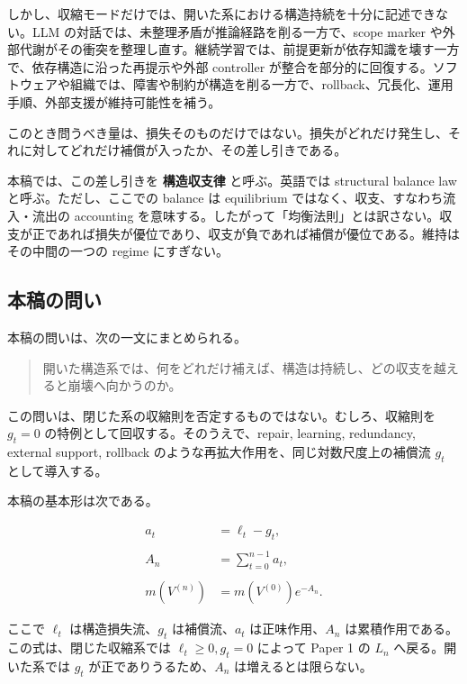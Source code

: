 \documentclass[12pt,a4paper]{article}
\begin{document}
しかし、収縮モードだけでは、開いた系における構造持続を十分に記述できない。LLM の対話では、未整理矛盾が推論経路を削る一方で、scope marker や外部代謝がその衝突を整理し直す。継続学習では、前提更新が依存知識を壊す一方で、依存構造に沿った再提示や外部 controller が整合を部分的に回復する。ソフトウェアや組織では、障害や制約が構造を削る一方で、rollback、冗長化、運用手順、外部支援が維持可能性を補う。

このとき問うべき量は、損失そのものだけではない。損失がどれだけ発生し、それに対してどれだけ補償が入ったか、その差し引きである。

本稿では、この差し引きを \textbf{構造収支律} と呼ぶ。英語では structural balance law と呼ぶ。ただし、ここでの balance は equilibrium ではなく、収支、すなわち流入・流出の accounting を意味する。したがって「均衡法則」とは訳さない。収支が正であれば損失が優位であり、収支が負であれば補償が優位である。維持はその中間の一つの regime にすぎない。

\subsection{本稿の問い}\label{ux672cux7a3fux306eux554fux3044}

本稿の問いは、次の一文にまとめられる。

\begin{quote}
開いた構造系では、何をどれだけ補えば、構造は持続し、どの収支を越えると崩壊へ向かうのか。
\end{quote}

この問いは、閉じた系の収縮則を否定するものではない。むしろ、収縮則を \(g_{t}=0\) の特例として回収する。そのうえで、repair, learning, redundancy, external support, rollback のような再拡大作用を、同じ対数尺度上の補償流 \(g_{t}\) として導入する。

本稿の基本形は次である。

\[
\begin{aligned}
a_{t} &= \ell_{t} - g_{t}, \\
\qquad \\
A_{n} &= \sum_{t=0}^{n-1} a_{t}, \\
\qquad \\
m(V^{(n)}) &= m(V^{(0)}) e^{-A_{n}}.
\end{aligned}
\]

ここで \(\ell_{t}\) は構造損失流、\(g_{t}\) は補償流、\(a_{t}\) は正味作用、\(A_{n}\) は累積作用である。この式は、閉じた収縮系では \(\ell_{t}\ge 0, g_{t}=0\) によって Paper 1 の \(L_{n}\) へ戻る。開いた系では \(g_{t}\) が正でありうるため、\(A_{n}\) は増えるとは限らない。
\end{document}
